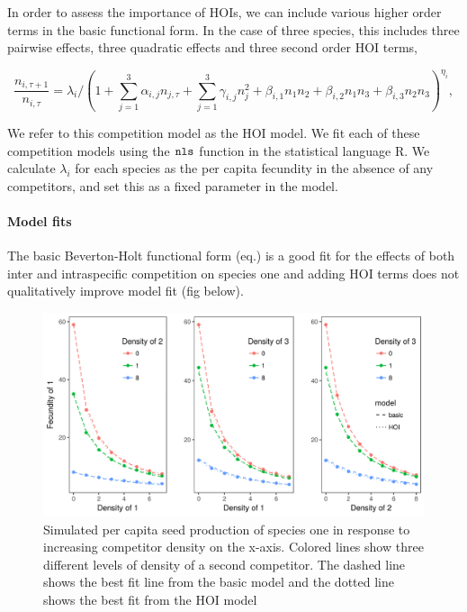 \documentclass[12pt,]{article}
\let\oldparagraph\paragraph
\renewcommand{\paragraph}[1]{\oldparagraph{#1}\mbox{}}
\begin{document}
In order to assess the importance of HOIs, we can include various higher
order terms in the basic functional form. In the case of three species,
this includes three pairwise effects, three quadratic effects and three
second order HOI terms,

\vspace{-1em}

\begin{equation} \label{eqHOI}
\frac{ n_{i,\tau+1} }{ n_{i,\tau} } = \lambda_{i}/(1 + \sum^3_{j=1} \alpha_{i,j} n_{j,\tau} + \sum^3_{j=1}\gamma_{i,j}n_j^2 + \beta_{i,1}n_1n_2 + \beta_{i,2}n_1n_3 + \beta_{i,3}n_2n_3)^{ \eta_i },
\end{equation}

We refer to this competition model as the HOI model. We fit each of
these competition models using the \(\tt{nls}\) function in the
statistical language R. We calculate \(\lambda_{i}\) for each species as
the per capita fecundity in the absence of any competitors, and set this
as a fixed parameter in the model.

\paragraph{Model fits}\label{model-fits}

The basic Beverton-Holt functional form (eq.) is a good fit for the
effects of both inter and intraspecific competition on species one and
adding HOI terms does not qualitatively improve model fit (fig below).

\begin{figure}
\centering
\includegraphics{../figures/species_1_fits_three_species.png}
\caption{Simulated per capita seed production of species one in response
to increasing competitor density on the x-axis. Colored lines show three
different levels of density of a second competitor. The dashed line
shows the best fit line from the basic model and the dotted line shows
the best fit from the HOI model}
\end{figure}
\end{document}
